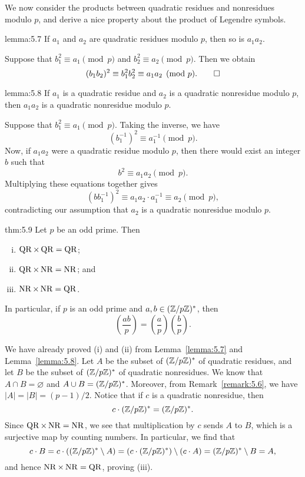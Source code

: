 We now consider the products between quadratic residues and nonresidues modulo $p$, 
and derive a nice property about the product of Legendre symbols. 

\newpage 
\begin{lemma}{lemma:5.7} 
    If $a_1$ and $a_2$ are quadratic residues modulo $p$, then so is $a_1a_2$. 
\end{lemma}
\begin{pf}
    Suppose that $b_1^2 \equiv a_1 \pmod p$ and $b_2^2 \equiv a_2 \pmod p$. Then 
    we obtain 
    \[ (b_1b_2)^2 \equiv b_1^2 b_2^2 \equiv a_1a_2 \pmod p. \qedhere \] 
\end{pf}

\begin{lemma}{lemma:5.8}
    If $a_1$ is a quadratic residue and $a_2$ is a quadratic nonresidue modulo $p$, 
    then $a_1a_2$ is a quadratic nonresidue modulo $p$. 
\end{lemma}
\begin{pf}
    Suppose that $b_1^2 \equiv a_1 \pmod p$. Taking the inverse, we have 
    \[ (b_1^{-1})^2 \equiv a_1^{-1} \pmod p. \] 
    Now, if $a_1a_2$ were a quadratic residue modulo $p$, then there would exist 
    an integer $b$ such that 
    \[ b^2 \equiv a_1a_2 \pmod p. \] 
    Multiplying these equations together gives 
    \[ (bb_1^{-1})^2 \equiv a_1a_2 \cdot a_1^{-1} \equiv a_2 \pmod p, \] 
    contradicting our assumption that $a_2$ is a quadratic nonresidue modulo $p$. 
\end{pf}

\begin{theo}{thm:5.9}
    Let $p$ be an odd prime. Then 
    \begin{enumerate}[(i)]
        \item $\operatorname{QR} \times \operatorname{QR} = \operatorname{QR}$; 
        \item $\operatorname{QR} \times \operatorname{NR} = \operatorname{NR}$; and 
        \item $\operatorname{NR} \times \operatorname{NR} = \operatorname{QR}$. 
    \end{enumerate}
    In particular, if $p$ is an odd prime and $a, b \in (\mathbb{Z}/p\mathbb{Z})^*$, then 
    \[ \left( \frac{ab}p \right) = \left( \frac ap \right) \left( \frac bp \right). \]
\end{theo}
\begin{pf}
    We have already proved (i) and (ii) from Lemma~\ref{lemma:5.7} and 
    Lemma~\ref{lemma:5.8}. Let $A$ be the subset of $(\mathbb{Z}/p\mathbb{Z})^*$ of quadratic 
    residues, and let $B$ be the subset of $(\mathbb{Z}/p\mathbb{Z})^*$ of quadratic nonresidues. 
    We know that $A \cap B = \varnothing$ and $A \cup B = (\mathbb{Z}/p\mathbb{Z})^*$. 
    Moreover, from Remark~\ref{remark:5.6}, we have $|A| = |B| = (p-1)/2$. 
    Notice that if $c$ is a quadratic nonresidue, then 
    \[ c \cdot (\mathbb{Z}/p\mathbb{Z})^* = (\mathbb{Z}/p\mathbb{Z})^*. \] 
    Since $\operatorname{QR} \times \operatorname{NR} = \operatorname{NR}$, we see that multiplication by $c$ sends $A$ 
    to $B$, which is a surjective map by counting numbers. In particular, 
    we find that 
    \[ c \cdot B = c \cdot ((\mathbb{Z}/p\mathbb{Z})^* \setminus A) = (c \cdot (\mathbb{Z}/p\mathbb{Z})^*) 
    \setminus (c \cdot A) = (\mathbb{Z}/p\mathbb{Z})^* \setminus B = A, \] 
    and hence $\operatorname{NR} \times \operatorname{NR} = \operatorname{QR}$, proving (iii). 
\end{pf}

